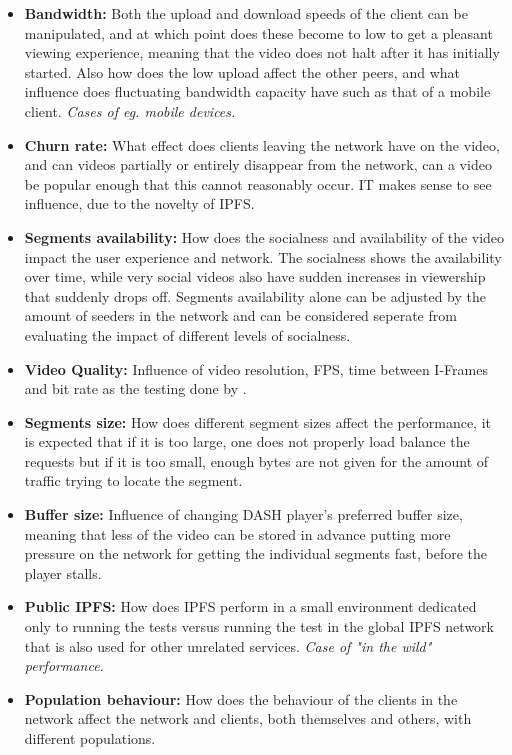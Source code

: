 \begin{itemize}
    \item \textbf{Bandwidth:}
    Both the upload and download speeds of the client can be manipulated, and at which point does these become to low to get a pleasant viewing experience, meaning that the video does not halt after it has initially started. Also how does the low upload affect the other peers, and what influence does fluctuating bandwidth capacity have such as that of a mobile client.
    \textit{Cases of eg. mobile devices.}
    \item \textbf{Churn rate:}
    What effect does clients leaving the network have on the video, and can videos partially or entirely disappear from the network, can a video be popular enough that this cannot reasonably occur. IT makes sense to see influence, due to the novelty of IPFS.
    \item \textbf{Segments availability:}
    How does the socialness and availability of the video impact the user experience and network. The socialness shows the availability over time, while very social videos also have sudden increases in viewership that suddenly drops off. Segments availability alone can be adjusted by the amount of seeders in the network and can be considered seperate from evaluating the impact of different levels of socialness.
    \item \textbf{Video Quality:}
    Influence of video resolution, \ac{FPS}, time between I-Frames and bit rate as the testing done by \citeauthor{aloman2015performance}.
    \item \textbf{Segments size:}
    How does different segment sizes affect the performance, it is expected that if it is too large, one does not properly load balance the requests but if it is too small, enough bytes are not given for the amount of traffic trying to locate the segment.
    \item \textbf{Buffer size:}
    Influence of changing \ac{DASH} player's preferred buffer size, meaning that less of the video can be stored in advance putting more pressure on the network for getting the individual segments fast, before the player stalls. %
    \item \textbf{Public IPFS:}
    How does \ac{IPFS} perform in a small environment dedicated only to running the tests versus running the test in the global \ac{IPFS} network that is also used for other unrelated services.
    \textit{Case of "in the wild" performance.} 
    \item \textbf{Population behaviour:}
    How does the behaviour of the clients in the network affect the network and clients, both themselves and others, with different populations.
\end{itemize}
